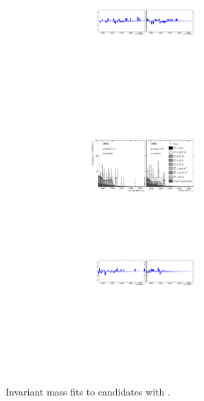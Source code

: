 \begin{figure}[!h]
\begin{subfigure}[t]{1.0\textwidth}
        \includegraphics[width=0.7\textwidth]{figs/Appendix_FitCategories/residuals_DsPhi_Ds2PiPiPi_both_summed_splitHel_splitKKPi_s21_s21r1_s24_s26.pdf}
    \end{subfigure}
    \begin{subfigure}[t]{1.0\textwidth}
        \centering
        \includegraphics[width=0.7\textwidth]{figs/Appendix_FitCategories/canvas_DsPhiSide_Ds2PiPiPi_both_summed_splitHel_splitKKPi_s21_s21r1_s24_s26.pdf}\\
        \includegraphics[width=0.7\textwidth]{figs/Appendix_FitCategories/residuals_DsPhiSide_Ds2PiPiPi_both_summed_splitHel_splitKKPi_s21_s21r1_s24_s26.pdf}
    \end{subfigure}
    \caption{Invariant mass fits to \decay{\Bp}{\Dsp\phiz} candidates with \decay{\Dsp}{\pip\pim\pip}.}
\end{figure}
